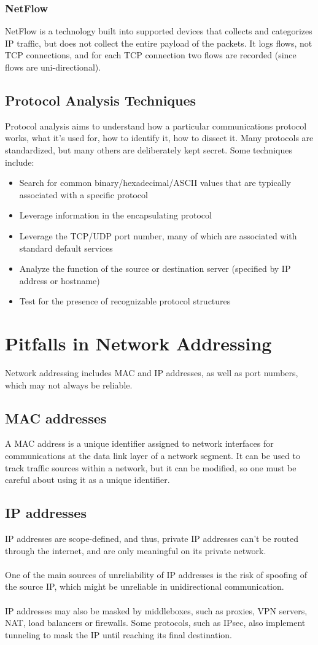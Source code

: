 \documentclass[10pt,a4paper]{report}
\begin{document}
\subsubsection{NetFlow}
NetFlow is a technology built into supported devices that collects and categorizes IP traffic, but does not collect the entire payload of the packets. It logs flows, not TCP connections, and for each TCP connection two flows are recorded (since flows are uni-directional).
\subsection{Protocol Analysis Techniques}
Protocol analysis aims to understand how a particular communications protocol works, what it’s used for, how to identify it, how to dissect it. Many protocols are standardized, but many others are deliberately kept secret. Some techniques include:
\begin{itemize}
\item Search for common binary/hexadecimal/ASCII values that are typically associated with a specific protocol
\item Leverage information in the encapsulating protocol
\item Leverage the TCP/UDP port number, many of which are associated with standard default services
\item Analyze the function of the source or destination server (specified by IP address or hostname)
\item Test for the presence of recognizable protocol structures
\end{itemize}
\section{Pitfalls in Network Addressing}
Network addressing includes MAC and IP addresses, as well as port numbers, which may not always be reliable.
\subsection{MAC addresses}
A MAC address is a unique identifier assigned to network interfaces for communications at the
data link layer of a network segment. It can be used to track traffic sources within a network, but  it can be modified, so one must be careful about using it as a unique identifier.
\subsection{IP addresses}
IP addresses are scope-defined, and thus, private IP addresses can't be routed through the internet, and are only meaningful on its private network.\\
\\
One of the main sources of unreliability of IP addresses is the risk of spoofing of the source IP, which might be unreliable in unidirectional communication.\\
\\
IP addresses may also be masked by middleboxes, such as proxies, VPN servers, NAT, load balancers or firewalls. Some protocols, such as IPsec, also implement tunneling to mask the IP until reaching its final destination.
\end{document}
